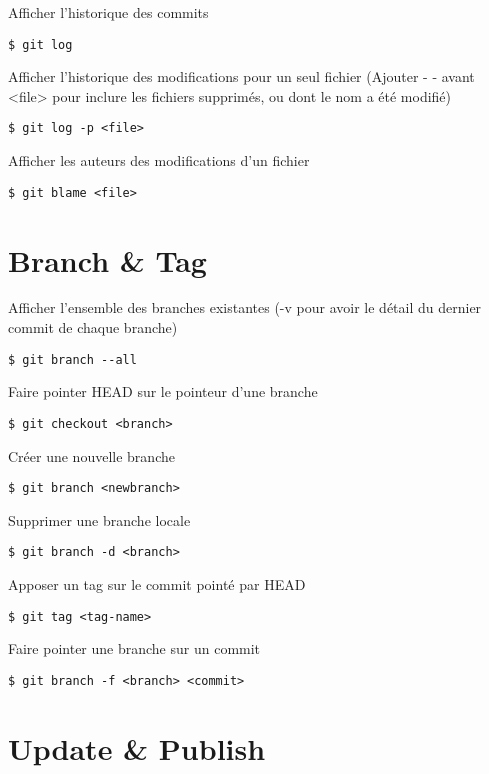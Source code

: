 \documentclass[jou,floatsintext]{apa6}
\begin{document}
Afficher l'historique des commits
\begin{lstlisting}
$ git log
\end{lstlisting}
Afficher l'historique des modifications pour un seul fichier (Ajouter - - avant <file> pour inclure les fichiers supprimés, ou dont le nom a été modifié)
\begin{lstlisting}
$ git log -p <file>
\end{lstlisting}
Afficher les auteurs des modifications d'un fichier
\begin{lstlisting}
$ git blame <file>
\end{lstlisting}

\section{Branch \& Tag}

Afficher l'ensemble des branches existantes (-v pour avoir le détail du dernier commit de chaque branche)
\begin{lstlisting}
$ git branch --all 
\end{lstlisting}
Faire pointer HEAD sur le pointeur d'une branche
\begin{lstlisting}
$ git checkout <branch>
\end{lstlisting}
Créer une nouvelle branche
\begin{lstlisting}
$ git branch <newbranch>
\end{lstlisting}
Supprimer une branche locale
\begin{lstlisting}
$ git branch -d <branch>
\end{lstlisting}
Apposer un tag sur le commit pointé par HEAD
\begin{lstlisting}
$ git tag <tag-name>
\end{lstlisting}
Faire pointer une branche sur un commit
\begin{lstlisting}
$ git branch -f <branch> <commit>
\end{lstlisting}

\section{Update \& Publish}
\end{document}
